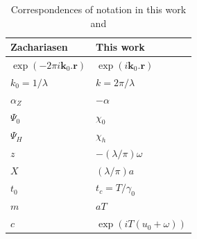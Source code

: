 \documentclass[preprint]{iucr}              %
\begin{document}
\begin{table}
\caption{Correspondences of notation in this work and \cite{ZachariasenBook}}
    \begin{center}
\begin{tabular}{ll}      %
 Zachariasen    & This work     \\
\hline
$\exp(-2\pi i \textbf{k}_0.\textbf{r})$ & $\exp(i\textbf{k}_0.\textbf{r})$      \\
 $k_0=1/\lambda$ & $k=2 \pi / \lambda$      \\
 $\alpha_Z$      & $-\alpha$                \\
 $\Psi_0$      & $\chi_0$                 \\
 $\Psi_H$      & $\chi_h$                 \\
 $z$           & $-(\lambda/\pi) \omega$  \\
 $X$           & $(\lambda/\pi) a$        \\
 $t_0$         & $t_c=T/\gamma_0$         \\
 $m$           & $a T$                    \\
 $c$  & $\exp(i T (u_0+\omega))$   
 \end{tabular}
     \end{center}
\end{table}












\end{document}
